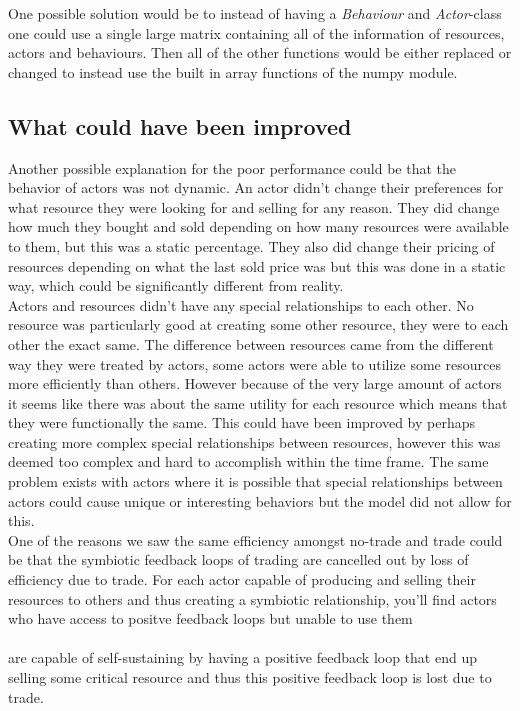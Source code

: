 \documentclass[11p]{article}
\begin{document}
One possible solution would be to instead of having a \textit{Behaviour} and \textit{Actor}-class one could use a single large matrix containing all of the information of resources, actors and behaviours. Then all of the other functions would be either replaced or changed to instead use the built in array functions of the numpy module. 

\subsection{What could have been improved}
Another possible explanation for the poor performance could be that the behavior of actors was not dynamic. An actor didn't change their preferences for what resource they were looking for and selling for any reason. They did change how much they bought and sold depending on how many resources were available to them, but this was a static percentage. They also did change their pricing of resources depending on what the last sold price was but this was done in a static way, which could be significantly different from reality.
\\

Actors and resources didn't have any special relationships to each other. No resource was particularly good at creating some other resource, they were to each other the exact same. The difference between resources came from the different way they were treated by actors, some actors were able to utilize some resources more efficiently than others. However because of the very large amount of actors it seems like there was about the same utility for each resource which means that they were functionally the same. This could have been improved by perhaps creating more complex special relationships between resources, however this was deemed too complex and hard to accomplish within the time frame. The same problem exists with actors where it is possible that special relationships between actors could cause unique or interesting behaviors but the model did not allow for this.
\\

One of the reasons we saw the same efficiency amongst no-trade and trade could be that the symbiotic feedback loops of trading are cancelled out by loss of efficiency due to trade. For each actor capable of producing and selling their resources to others and thus creating a symbiotic relationship, you'll find actors who have access to positve feedback loops but unable to use them\\\\ are capable of self-sustaining by having a positive feedback loop that end up selling some critical resource and thus this positive feedback loop is lost due to trade.
\\
\end{document}
